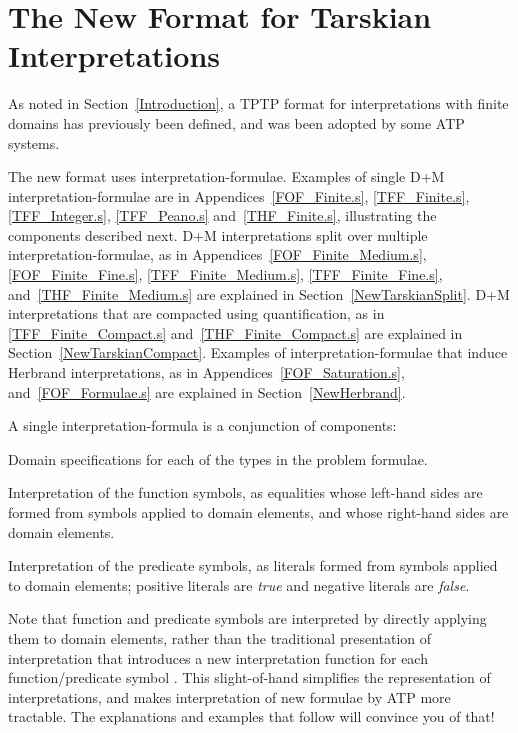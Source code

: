 \documentclass{easychair}
\newenvironment{packed_itemize}{
\vspace*{-0.2em}
\begin{itemize}
\setlength{\partopsep}{0pt}
\setlength{\itemsep}{1pt}
\setlength{\parskip}{0pt}
\setlength{\parsep}{0pt}
}{\end{itemize}}
\begin{document}
\section{The New Format for Tarskian Interpretations}
\label{NewTarskian}

As noted in Section~\ref{Introduction}, a TPTP format for interpretations with finite domains 
has previously been defined, and was been adopted by some ATP systems.

The new format uses interpretation-formulae.
Examples of single {\sf D+M} interpretation-formulae are in Appendices~\ref{FOF_Finite.s}, 
\ref{TFF_Finite.s}, \ref{TFF_Integer.s}, \ref{TFF_Peano.s} and~\ref{THF_Finite.s}, illustrating 
the components described next. 
{\sf D+M} interpretations split over multiple interpretation-formulae, as in 
Appendices~\ref{FOF_Finite_Medium.s}, \ref{FOF_Finite_Fine.s}, \ref{TFF_Finite_Medium.s}, 
\ref{TFF_Finite_Fine.s}, and~\ref{THF_Finite_Medium.s} are explained in 
Section~\ref{NewTarskianSplit}.
{\sf D+M} interpretations that are compacted using quantification, as in \ref{TFF_Finite_Compact.s}
and~\ref{THF_Finite_Compact.s} are explained in Section~\ref{NewTarskianCompact}.
Examples of interpretation-formulae that induce Herbrand interpretations, as in 
Appendices~\ref{FOF_Saturation.s}, and~\ref{FOF_Formulae.s} are explained in 
Section~\ref{NewHerbrand}.

A single interpretation-formula is a conjunction of components:
\begin{packed_itemize}
\item Domain specifications for each of the types in the problem formulae.
\item Interpretation of the function symbols, as equalities whose left-hand sides are formed from 
      symbols applied to domain elements, and whose right-hand sides are domain elements.
\item Interpretation of the predicate symbols, as literals formed from symbols applied
      to domain elements; positive literals are {\em true} and negative literals are {\em false}.
\end{packed_itemize}

Note that function and predicate symbols are interpreted by directly applying them to domain
elements, rather than the traditional presentation of interpretation that introduces a new
interpretation function for each function/predicate symbol \cite[p.999]{Gal15}.
This slight-of-hand simplifies the representation of interpretations, and makes interpretation
of new formulae by ATP more tractable.
The explanations and examples that follow will convince you of that!
\end{document}
